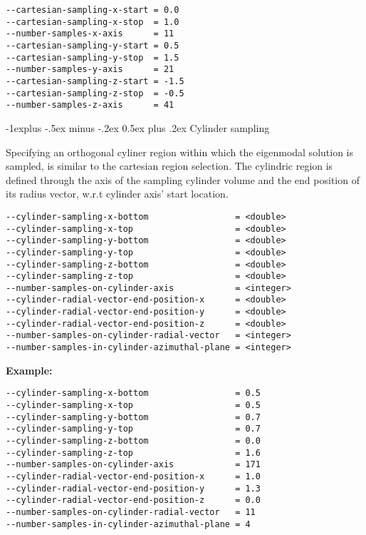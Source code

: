 \documentclass[10pt,landscape,a4paper]{article}
\makeatletter
\renewcommand{\subsection}{\@startsection{subsection}{2}{0mm}%
                                {-1explus -.5ex minus -.2ex}%
                                {0.5ex plus .2ex}%
                                {\normalfont\normalsize\bfseries}}
\makeatother
\begin{document}
\begin{multicols}{3}
\begin{verbatim}
--cartesian-sampling-x-start = 0.0
--cartesian-sampling-x-stop  = 1.0
--number-samples-x-axis      = 11
--cartesian-sampling-y-start = 0.5    
--cartesian-sampling-y-stop  = 1.5
--number-samples-y-axis      = 21
--cartesian-sampling-z-start = -1.5
--cartesian-sampling-z-stop  = -0.5
--number-samples-z-axis      = 41
\end{verbatim}



\subsection{Cylinder sampling}
\label{section_result_file}

Specifying an orthogonal cyliner region within which
the eigenmodal solution is sampled, is similar to the
cartesian region selection. The cylindric region is
defined through the axis of the sampling cylinder volume
and the end position of its radius vector, w.r.t cylinder
axis' start location.



\begin{verbatim}
--cylinder-sampling-x-bottom                 = <double>
--cylinder-sampling-x-top                    = <double>
--cylinder-sampling-y-bottom                 = <double>   
--cylinder-sampling-y-top                    = <double>        
--cylinder-sampling-z-bottom                 = <double>
--cylinder-sampling-z-top                    = <double>
--number-samples-on-cylinder-axis            = <integer>
--cylinder-radial-vector-end-position-x      = <double>
--cylinder-radial-vector-end-position-y      = <double>
--cylinder-radial-vector-end-position-z      = <double>
--number-samples-on-cylinder-radial-vector   = <integer>
--number-samples-in-cylinder-azimuthal-plane = <integer>
\end{verbatim}

\vspace{2mm}

\noindent \textbf{\textsf{Example:}}

\begin{verbatim}
--cylinder-sampling-x-bottom                 = 0.5
--cylinder-sampling-x-top                    = 0.5
--cylinder-sampling-y-bottom                 = 0.7
--cylinder-sampling-y-top                    = 0.7
--cylinder-sampling-z-bottom                 = 0.0
--cylinder-sampling-z-top                    = 1.6
--number-samples-on-cylinder-axis            = 171
--cylinder-radial-vector-end-position-x      = 1.0
--cylinder-radial-vector-end-position-y      = 1.3
--cylinder-radial-vector-end-position-z      = 0.0
--number-samples-on-cylinder-radial-vector   = 11
--number-samples-in-cylinder-azimuthal-plane = 4
\end{verbatim}


\end{multicols}
\end{document}
